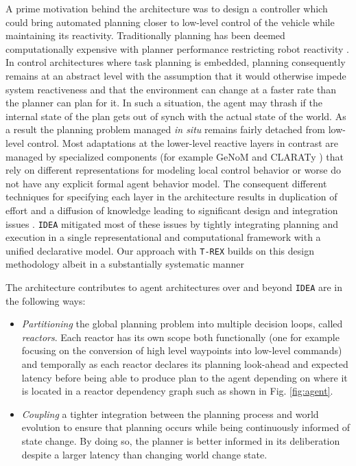 A prime motivation behind the \rx architecture was to design a
controller which could bring automated planning closer to low-level
control of the vehicle while maintaining its reactivity. Traditionally
planning has been deemed computationally expensive with planner
performance restricting robot reactivity
\cite{ghallab04,Dias:2003ua}. In control architectures where task
planning is embedded, planning consequently remains at an abstract
level with the assumption that it would otherwise impede system
reactiveness and that the environment can change at a faster rate than
the planner can plan for it. In such a situation, the agent may thrash
if the internal state of the plan gets out of synch with the actual
state of the world. As a result the planning problem managed {\em in
  situ} remains fairly detached from low-level control. Most
adaptations at the lower-level reactive layers in contrast are managed
by specialized components (for example GeNoM \comment{} and CLARATy
\comment{}) that rely on different representations for modeling local
control behavior or worse do not have any explicit formal agent
behavior model. The consequent different techniques for specifying
each layer in the architecture results in duplication of effort and a
diffusion of knowledge leading to significant design and integration
issues \cite{DS1report}.  \texttt{IDEA} mitigated most of these issues
by tightly integrating planning and execution in a single
representational and computational framework with a unified
declarative model. Our approach with \texttt{T-REX} builds on this
design methodology albeit in a substantially systematic manner

The \rx architecture contributes to agent architectures over and
beyond \texttt{IDEA} are in the following ways:

\begin{itemize}

\item \emph{Partitioning} the global planning problem into multiple
  decision loops, called {\em reactors}. Each reactor has its own
  scope both functionally (one for example focusing on the conversion
  of high level waypoints into low-level commands) and temporally as
  each reactor declares its planning look-ahead and expected latency
  before being able to produce plan to the agent depending on where it
  is located in a reactor dependency graph such as shown in
  Fig. \ref{fig:agent}.

\item \emph{Coupling} a tighter integration between the planning
  process and world evolution to ensure that planning occurs while
  being continuously informed of state change. By doing so, the
  planner is better informed in its deliberation despite a larger
  latency than changing world change state.

\end{itemize}

